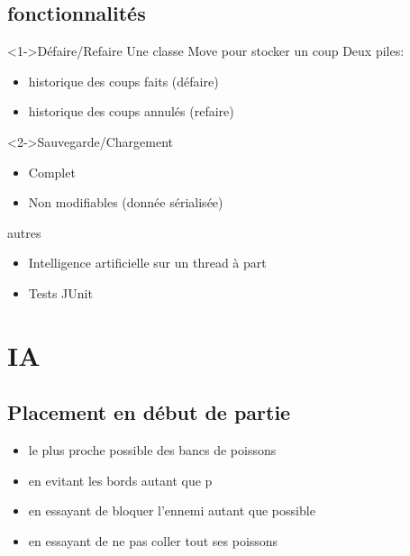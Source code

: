 \documentclass{beamer}
\begin{document}
\subsection{fonctionnalités}
\begin{frame}{}
\begin{block}<1->{Défaire/Refaire} %
Une classe Move pour stocker un coup \newline
Deux piles: 
\begin{itemize}
 \item historique des coups faits (défaire)
 \item historique des coups annulés (refaire)
\end{itemize}
\end{block}
\begin{block}<2->{Sauvegarde/Chargement}
\begin{itemize}
\item Complet
\item Non modifiables (donnée sérialisée)
\end{itemize}
\end{block}
\end{frame}

\begin{frame}{}
\begin{block}{autres}
\begin{itemize}
\item<1-> Intelligence artificielle sur un thread à part
\item<2-> Tests JUnit
\end{itemize}
\end{block}
\end{frame}


\section{IA}

\subsection{Placement en début de partie}
\begin{frame}{}
\begin{block}{}
\begin{itemize}
 \item<1-> le plus proche possible des bancs de poissons
 \item<2-> en evitant les bords autant que p
 \item<3-> en essayant de bloquer l'ennemi autant que possible
 \item<4-> en essayant de ne pas coller tout ses poissons
\end{itemize}
\end{block}
\end{frame}
\end{document}
